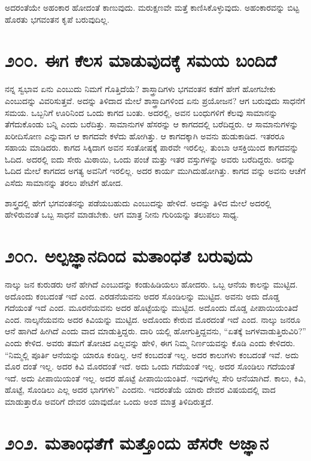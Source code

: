 ಅದರಂತೆಯೇ ಅಹಂಕಾರ ಹೋದಂತೆ ಕಾಣುವುದು. ಮರುಕ್ಷಣವೇ ಮತ್ತೆ ಕಾಣಿಸಿಕೊಳ್ಳುವುದು. ಅಹಂಕಾರವನ್ನು ಬಿಟ್ಟ ಹೊರತು ಭಗವಂತನ ಕೃಪೆ ಬರುವುದಿಲ್ಲ.


\section{\num{೨೦೦. } ಈಗ ಕೆಲಸ ಮಾಡುವುದಕ್ಕೆ ಸಮಯ ಬಂದಿದೆ}

ನನ್ನ ಸ್ವಭಾವ ಏನು ಎಂಬುದು ನಿಮಗೆ ಗೊತ್ತಿದೆಯೆ? ಶಾಸ್ತ್ರಾದಿಗಳು ಭಗವಂತನ ಕಡೆಗೆ ಹೇಗೆ ಹೋಗಬೇಕು ಎಂಬುದನ್ನು ವಿವರಿಸುತ್ತವೆ. ಅದನ್ನು ತಿಳಿದಾದ ಮೇಲೆ ಶಾಸ್ತ್ರಾದಿಗಳಿಂದ ಏನು ಪ್ರಯೋಜನ? ಆಗ ಬರುವುದು ಸಾಧನೆಗೆ ಸಮಯ. ಒಬ್ಬನಿಗೆ ಊರಿನಿಂದ ಒಂದು ಕಾಗದ ಬಂತು. ಅದರಲ್ಲಿ, ಅವನ ಬಂಧುಗಳಿಗೆ ಕೆಲವು ಸಾಮಾನನ್ನು ತೆಗೆದುಕೊಂಡು ಬನ್ನಿ ಎಂದು ಬರೆದಿತ್ತು. ಸಾಮಾನುಗಳ ಹೆಸರನ್ನು ಆ ಕಾಗದದಲ್ಲಿ ಬರೆದಿದ್ದರು. ಆ ಸಾಮಾನುಗಳನ್ನು ಖರೀದಿಸೋಣ ಎನ್ನುವಾಗ ಆ ಕಾಗದವೇ ಕಳೆದು ಹೋಗಿತ್ತು. ಆ ಕಾಗದಕ್ಕಾಗಿ ಅವನು ಹುಡುಕಾಡಿದ. ಇತರರೂ ಸಹಾಯ ಮಾಡಿದರು. ಕಾಗದ ಸಿಕ್ಕಿದಾಗ ಅವನ ಸಂತೋಷಕ್ಕೆ ಪಾರವೇ ಇರಲಿಲ್ಲ. ತುಂಬಾ ಆಸಕ್ತಿಯಿಂದ ಕಾಗದವನ್ನು ಓದಿದ. ಅದರಲ್ಲಿ ಐದು ಸೇರು ಮಿಠಾಯಿ, ಒಂದು ಪಂಚೆ ಮತ್ತು ಇತರ ವಸ್ತುಗಳನ್ನು ಅವರು ಬರೆದಿದ್ದರು. ಅದನ್ನು ಓದಿದ ಮೇಲೆ ಕಾಗದದ ಅಗತ್ಯ ಅವನಿಗೆ ಇರಲಿಲ್ಲ. ಅದರ ಕಾರ್ಯ ಮುಗಿದುಹೋಗಿತ್ತು. ಕಾಗದ ವನ್ನು ಅವನು ಆಚೆಗೆ ಎಸೆದು ಸಾಮಾನನ್ನು ತರಲು ಪೇಟೆಗೆ ಹೋದ.

ಶಾಸ್ತ್ರದಲ್ಲಿ ಹೇಗೆ ಭಗವಂತನನ್ನು ಪಡೆಯಬಹುದು ಎಂಬುದನ್ನು ಹೇಳಿದೆ. ಅದನ್ನು ತಿಳಿದ ಮೇಲೆ ಅದರಲ್ಲಿ ಹೇಳಿರುವಂತೆ ಒಬ್ಬ ಸಾಧನೆ ಮಾಡಬೇಕು. ಆಗ ಮಾತ್ರ ನೀನು ಗುರಿಯನ್ನು ತಲುಪಲು ಸಾಧ್ಯ.


\section{\num{೨೦೧. } ಅಲ್ಪಜ್ಞಾನದಿಂದ ಮತಾಂಧತೆ ಬರುವುದು}

ನಾಲ್ಕು ಜನ ಕುರುಡರು ಆನೆ ಹೇಗಿದೆ ಎಂಬುದನ್ನು ಕಂಡುಹಿಡಿಯಲು ಹೋದರು. ಒಬ್ಬ ಆನೆಯ ಕಾಲನ್ನು ಮುಟ್ಟಿದ. ಅದೊಂದು ಕಂಬದಂತೆ ಇದೆ ಎಂದ. ಎರಡನೆಯವನು ಅದರ ಸೊಂಡಿಲನ್ನು ಮುಟ್ಟಿದ. ಅವನು ಅದು ದೊಡ್ಡ ಗದೆಯಂತೆ ಇದೆ ಎಂದ. ಮೂರನೆಯವನು ಅದರ ಹೊಟ್ಟೆಯನ್ನು ಮುಟ್ಟಿದ. ಅದೊಂದು ದೊಡ್ಡ ಪೀಪಾಯಿಯಂತಿದೆ ಎಂದ. ನಾಲ್ಕನೆಯವನು ಅದರ ಕಿವಿಯನ್ನು ಮುಟ್ಟಿದ. ಅದೊಂದು ಕೇರುವ ಮೊರದಂತೆ ಇದೆ ಎಂದ. ನಾಲ್ಕು ಜನರೂ ಆನೆ ಹಾಗಿದೆ ಹೀಗಿದೆ ಎಂದು ವಾದ ಮಾಡುತ್ತಿದ್ದರು. ದಾರಿ ಯಲ್ಲಿ ಹೋಗುತ್ತಿದ್ದವನು, “ಏತಕ್ಕೆ ಜಗಳವಾಡುತ್ತಿರುವಿರಿ?” ಎಂದು ಕೇಳಿದ. ಅವರು ತಮಗೆ ತೋಚಿದ ಎಲ್ಲವನ್ನು ಹೇಳಿ, ಈಗ ನಿಮ್ಮ ನಿರ್ಣಯವನ್ನು ಕೊಡಿ ಎಂದು ಕೇಳಿದರು. “ನಿಮ್ಮಲ್ಲಿ ಪೂರ್ತಿ ಆನೆಯನ್ನು ಯಾರೂ ಕಂಡಿಲ್ಲ. ಆನೆ ಕಂಬದಂತೆ ಇಲ್ಲ. ಅದರ ಕಾಲುಗಳು ಕಂಬದಂತೆ ಇವೆ. ಅದು ಮೊರ ದಂತೆ ಇಲ್ಲ. ಅದರ ಕಿವಿ ಮೊರದಂತೆ ಇದೆ. ಅದು ಒಂದು ಗದೆಯಂತೆ ಇಲ್ಲ. ಅದರ ಸೊಂಡಿಲು ಗದೆಯಂತೆ ಇದೆ. ಅದು ಪೀಪಾಯಿಯಂತೆ ಇಲ್ಲ. ಅದರ ಹೊಟ್ಟೆ ಪೀಪಾಯಿಯಂತಿದೆ. ಇವುಗಳೆಲ್ಲ ಸೇರಿ ಆನೆಯಾಗಿದೆ. ಕಾಲು, ಕಿವಿ, ಹೊಟ್ಟೆ, ಸೊಂಡಿಲು ಎಲ್ಲ ಅದರ ಭಾಗಗಳು” ಎಂದನು. ಇದರಂತೆಯೆ ಯಾರು ದೇವರ ವಿಷಯದಲ್ಲಿ ವಾದ ಮಾಡುತ್ತಾರೊ ಅವರಿಗೆ ದೇವರ ಯಾವುದೋ ಒಂದು ಅಂಶ ಮಾತ್ರ ತಿಳಿದಿರುತ್ತದೆ.


\section{\num{೨೦೨. } ಮತಾಂಧತೆಗೆ ಮತ್ತೊಂದು ಹೆಸರೇ ಅಜ್ಞಾನ}

